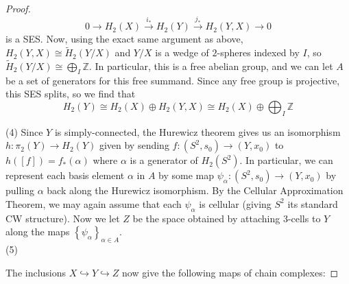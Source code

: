 \begin{proof}
    \[
    0 \to H_2 \left( X \right) \stackrel{i_*}{\to} 
    H_2 (Y) \stackrel{j_*}{\to}  H_2 (Y,X) \to 0
    \] 
    is a SES.
    Now, using the exact same argument as above,
    $H_2 \left( Y,X \right) \cong
    \tilde{H}_2 (Y /X)$ and $Y / X$ is a wedge of
    $2$-spheres indexed by $I$, so 
    $\tilde{H}_2 \left( Y / X \right) \cong
    \bigoplus_{I} \mathbb{Z}$.
    In particular, this is a free abelian group, and
    we can let $A$ be a set of generators
    for this free summand.
    Since any free group is projective,
    this SES splits, so we find that
    \[
    H_2 (Y) \cong H_2 (X) \oplus H_2 (Y,X)
    \cong H_2 (X) \oplus \bigoplus_{I} \mathbb{Z}
    \] 


    (4) Since $Y$ is simply-connected, the Hurewicz
    theorem gives us an isomorphism
    $h \colon \pi_2 (Y) \to H_2 (Y)$ given
    by sending $f \colon \left( S^2, s_0 \right) 
    \to \left( Y,x_0 \right) $ to
    $h \left( \left[ f \right]  \right) =
    f_* \left( \alpha \right) $ where $\alpha$ is
    a generator of $H_2 \left( S^2 \right) $.
    In particular, we can represent each
    basis element $\alpha$ in $A$ by some
    map $\psi_{\alpha} \colon \left( S^2,s_0 \right) 
    \to \left( Y,x_0 \right) $ by pulling $\alpha$ back
    along the Hurewicz isomorphism.
    By the Cellular Approximation Theorem, we may
    again assume that each  $\psi_{\alpha}$ is cellular
    (giving $S^2$ its standard CW structure).
    Now we let $Z$ be the space obtained
    by attaching $3$-cells to $Y$ along the maps
    $\left\{ \psi_{\alpha} \right\}_{\alpha \in A}$.\\
    \linebreak
    (5) 

    The inclusions $X \hookrightarrow Y \hookrightarrow Z$ now
    give the following maps of chain complexes:
    

\end{proof}
